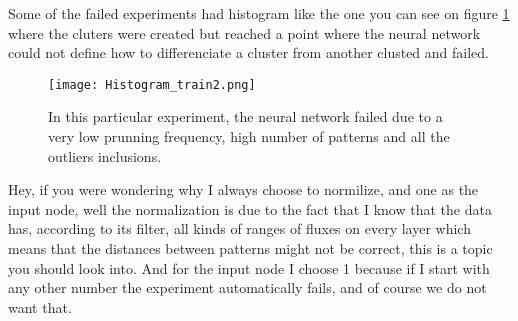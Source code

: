 \documentclass[11pt,fleqn]{book} %
\begin{document}
																																																																																																																																																																																																																																														Some of the failed experiments had histogram like the one you can see on figure \ref{img:faildtrain2} where the cluters were created but reached a point where the neural network could not define how to differenciate a cluster from another clusted and failed.

																																																																																																																																																																																																																																														\begin{figure}[h!]
																																																																																																																																																																																																																																															\centering
																																																																																																																																																																																																																																															    \texttt{[image: Histogram\_train2.png]}
																																																																																																																																																																																																																																															        \caption{In this particular experiment, the neural network failed due to a very low prunning frequency, high number of patterns and all the outliers inclusions.}
																																																																																																																																																																																																																																																    \label{img:faildtrain2}
																																																																																																																																																																																																																																																    \end{figure}

																																																																																																																																																																																																																																																    Hey, if you were wondering why I always choose to normilize, and one as the input node, well the normalization is due to the fact that I know that the data has, according to its filter, all kinds of ranges of fluxes on every layer which means that the distances between patterns might not be correct, this is a topic you should look into. And for the input node I choose 1 because if I start with any other number the experiment automatically fails, and of course we do not want that.
\end{document}
